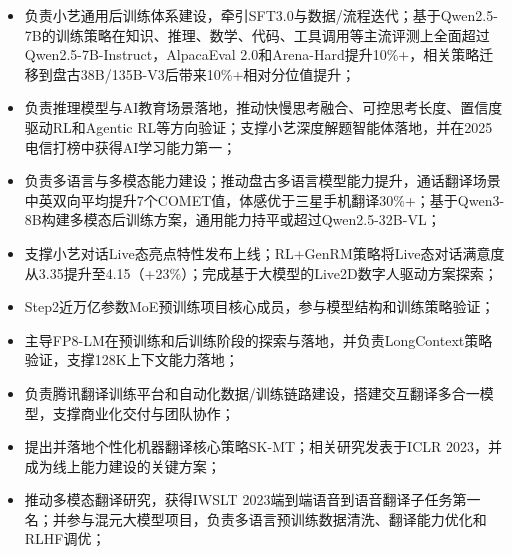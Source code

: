\documentclass{resume}
\begin{document}
\begin{itemize}
\item 负责小艺通用后训练体系建设，牵引SFT3.0与数据/流程迭代；基于Qwen2.5-7B的训练策略在知识、推理、数学、代码、工具调用等主流评测上全面超过Qwen2.5-7B-Instruct，AlpacaEval 2.0和Arena-Hard提升10\%+，相关策略迁移到盘古38B/135B-V3后带来10\%+相对分位值提升；
\item 负责推理模型与AI教育场景落地，推动快慢思考融合、可控思考长度、置信度驱动RL和Agentic RL等方向验证；支撑小艺深度解题智能体落地，并在2025电信打榜中获得AI学习能力第一；
\item 负责多语言与多模态能力建设；推动盘古多语言模型能力提升，通话翻译场景中英双向平均提升7个COMET值，体感优于三星手机翻译30\%+；基于Qwen3-8B构建多模态后训练方案，通用能力持平或超过Qwen2.5-32B-VL；
\item 支撑小艺对话Live态亮点特性发布上线；RL+GenRM策略将Live态对话满意度从3.35提升至4.15（+23\%）；完成基于大模型的Live2D数字人驱动方案探索；
\end{itemize}

\begin{itemize}
\item Step2近万亿参数MoE预训练项目核心成员，参与模型结构和训练策略验证；
\item 主导FP8-LM在预训练和后训练阶段的探索与落地，并负责LongContext策略验证，支撑128K上下文能力落地；
\end{itemize}

\begin{itemize}
  \item 负责腾讯翻译训练平台和自动化数据/训练链路建设，搭建交互翻译多合一模型，支撑商业化交付与团队协作；
  \item 提出并落地个性化机器翻译核心策略SK-MT；相关研究发表于ICLR 2023，并成为线上能力建设的关键方案；
  \item 推动多模态翻译研究，获得IWSLT 2023端到端语音到语音翻译子任务第一名；并参与混元大模型项目，负责多语言预训练数据清洗、翻译能力优化和RLHF调优；
\end{itemize}
\end{document}
